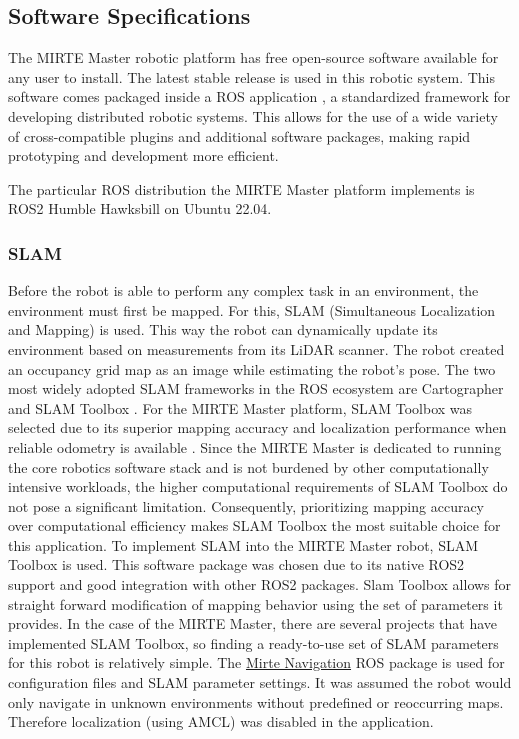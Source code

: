 \subsection{Software Specifications}

The MIRTE Master robotic platform has free open-source software available for any user to install. \newline
The latest stable release is used in this robotic system. This software comes packaged inside a ROS application \citet{ROS2_2022}, a standardized framework for developing distributed robotic systems. This allows for the use of a wide variety of cross-compatible plugins and additional software packages, making rapid prototyping and development more efficient.

The particular ROS distribution the MIRTE Master platform implements is ROS2 Humble Hawksbill on Ubuntu 22.04.

\subsubsection{SLAM}

Before the robot is able to perform any complex task in an environment, the environment must first be mapped. For this, SLAM (Simultaneous Localization and Mapping) is used. This way the robot can dynamically update its environment based on measurements from its LiDAR scanner.
The robot created an occupancy grid map as an image while estimating the robot's pose.
The two most widely adopted SLAM frameworks in the ROS ecosystem are Cartographer \citep{cartographer} and SLAM Toolbox \citep{SlamTBX2021}. For the MIRTE Master platform, SLAM Toolbox was selected due to its superior mapping accuracy and localization performance when reliable odometry is available \citep{slamvcart}. Since the MIRTE Master is dedicated to running the core robotics software stack and is not burdened by other computationally intensive workloads, the higher computational requirements of SLAM Toolbox do not pose a significant limitation. Consequently, prioritizing mapping accuracy over computational efficiency makes SLAM Toolbox the most suitable choice for this application.
To implement SLAM into the MIRTE Master robot, SLAM Toolbox is used. This software package was chosen due to its native ROS2 support and good integration with other ROS2 packages. Slam Toolbox allows for straight forward modification of mapping behavior using the set of parameters it provides. In the case of the MIRTE Master, there are several projects that have implemented SLAM Toolbox, so finding a ready-to-use set of SLAM parameters for this robot is relatively simple. The \href{https://github.com/MartijnWisse/mirte\_navigation}{Mirte Navigation} ROS package is used for configuration files and SLAM parameter settings.
It was assumed the robot would only navigate in unknown environments without predefined or reoccurring maps. Therefore localization (using AMCL) was disabled in the application.

